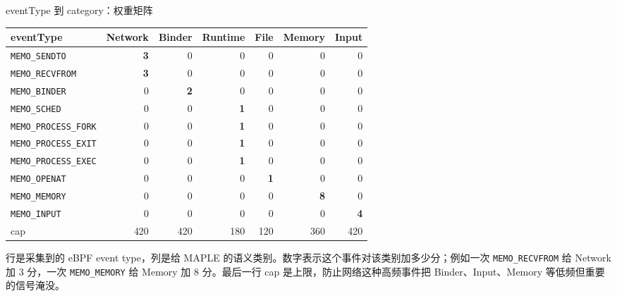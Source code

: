 \documentclass[UTF8,aspectratio=169,10pt]{ctexbeamer}
\newcommand{\code}[1]{\texttt{\small #1}}
\newcommand{\explainfoot}[1]{%
  \vspace{0.35em}
  {\scriptsize\color{memoGray}#1}
}
\begin{document}
\begin{frame}{eventType 到 category：权重矩阵}
  \scriptsize
  \begin{tabular}{lrrrrrr}
    \toprule
    eventType & Network & Binder & Runtime & File & Memory & Input \\
    \midrule
    \code{MEMO\_SENDTO} & \textbf{3} & 0 & 0 & 0 & 0 & 0 \\
    \code{MEMO\_RECVFROM} & \textbf{3} & 0 & 0 & 0 & 0 & 0 \\
    \code{MEMO\_BINDER} & 0 & \textbf{2} & 0 & 0 & 0 & 0 \\
    \code{MEMO\_SCHED} & 0 & 0 & \textbf{1} & 0 & 0 & 0 \\
    \code{MEMO\_PROCESS\_FORK} & 0 & 0 & \textbf{1} & 0 & 0 & 0 \\
    \code{MEMO\_PROCESS\_EXIT} & 0 & 0 & \textbf{1} & 0 & 0 & 0 \\
    \code{MEMO\_PROCESS\_EXEC} & 0 & 0 & \textbf{1} & 0 & 0 & 0 \\
    \code{MEMO\_OPENAT} & 0 & 0 & 0 & \textbf{1} & 0 & 0 \\
    \code{MEMO\_MEMORY} & 0 & 0 & 0 & 0 & \textbf{8} & 0 \\
    \code{MEMO\_INPUT} & 0 & 0 & 0 & 0 & 0 & \textbf{4} \\
    \midrule
    cap & 420 & 420 & 180 & 120 & 360 & 420 \\
    \bottomrule
  \end{tabular}
  \vspace{0.5em}
  \explainfoot{行是采集到的 eBPF event type，列是给 MAPLE 的语义类别。数字表示这个事件对该类别加多少分；例如一次 \code{MEMO\_RECVFROM} 给 Network 加 3 分，一次 \code{MEMO\_MEMORY} 给 Memory 加 8 分。最后一行 cap 是上限，防止网络这种高频事件把 Binder、Input、Memory 等低频但重要的信号淹没。}
\end{frame}
\end{document}
